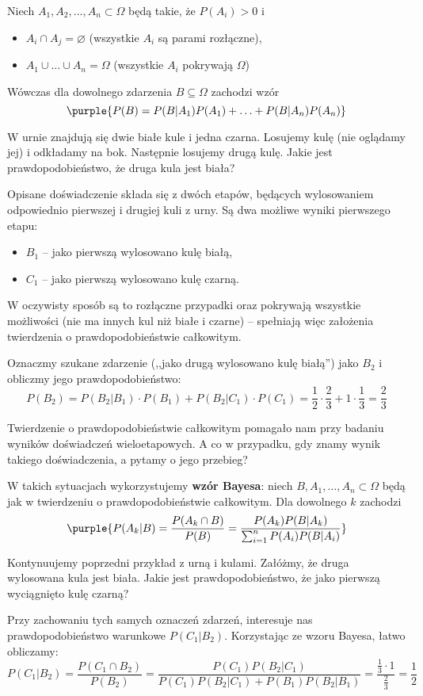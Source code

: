 Niech $A_1, A_2, ..., A_n \subset \Omega$ będą takie, że $P(A_i)>0$ i
\begin{itemize}
    \item $A_i\cap A_j=\varnothing$ (wszystkie $A_i$ są parami rozłączne),
    \item $A_1\cup\ldots\cup A_n=\Omega$ (wszystkie $A_i$ pokrywają $\Omega$)
\end{itemize}
Wówczas dla dowolnego zdarzenia $B \subseteq \Omega$ zachodzi wzór
$$\purple{P(B) = P(B|A_1)P(A_1)+\ldots+P(B|A_n)P(A_n)}$$

\begin{example}
    W urnie znajdują się dwie białe kule i jedna czarna. Losujemy kulę (nie oglądamy jej) i odkładamy na bok. Następnie losujemy drugą kulę. Jakie jest prawdopodobieństwo, że druga kula jest biała?

    Opisane doświadczenie składa się z dwóch etapów, będących wylosowaniem odpowiednio pierwszej i drugiej kuli z urny. Są dwa możliwe wyniki pierwszego etapu:
    \begin{itemize}
        \item $B_1$ -- jako pierwszą wylosowano kulę białą,
        \item $C_1$ -- jako pierwszą wylosowano kulę czarną.
    \end{itemize}
    W oczywisty sposób są to rozłączne przypadki oraz pokrywają wszystkie możliwości (nie ma innych kul niż białe i czarne) -- spełniają więc założenia twierdzenia o prawdopodobieństwie całkowitym.

    Oznaczmy szukane zdarzenie (,,jako drugą wylosowano kulę białą'') jako $B_2$ i obliczmy jego prawdopodobieństwo:
    $$P(B_2) = P(B_2 | B_1) \cdot P(B_1) + P(B_2 | C_1) \cdot P(C_1) = \frac{1}{2} \cdot \frac{2}{3} + 1 \cdot \frac{1}{3} = \frac{2}{3}$$
\end{example}

Twierdzenie o prawdopodobieństwie całkowitym pomagało nam przy badaniu wyników doświadczeń wieloetapowych. A co w przypadku, gdy znamy wynik takiego doświadczenia, a pytamy o jego przebieg?

W takich sytuacjach wykorzystujemy \textbf{wzór Bayesa}:
niech $B,A_1,\ldots,A_n\subset\Omega$ będą jak w twierdzeniu o prawdopodobieństwie całkowitym. Dla dowolnego $k$ zachodzi
$$
\purple{P(A_k|B) = \frac{P(A_k\cap B)}{P(B)} = \frac{P(A_k)P(B|A_k)}{\sum_{i=1}^n P(A_i)P(B|A_i)}}
$$

\begin{example}
    Kontynuujemy poprzedni przykład z urną i kulami. Załóżmy, że druga wylosowana kula jest biała. Jakie jest prawdopodobieństwo, że jako pierwszą wyciągnięto kulę czarną?

    Przy zachowaniu tych samych oznaczeń zdarzeń, interesuje nas prawdopodobieństwo warunkowe $P(C_1 | B_2)$. Korzystając ze wzoru Bayesa, łatwo obliczamy:
    $$P(C_1 | B_2) = \frac{P(C_1 \cap B_2)}{P(B_2)} = \frac{P(C_1)P(B_2 | C_1)}{P(C_1)P(B_2 | C_1) + P(B_1)P(B_2 | B_1)} = \frac{\frac{1}{3} \cdot 1}{\frac{2}{3}} = \frac{1}{2}$$
\end{example}

